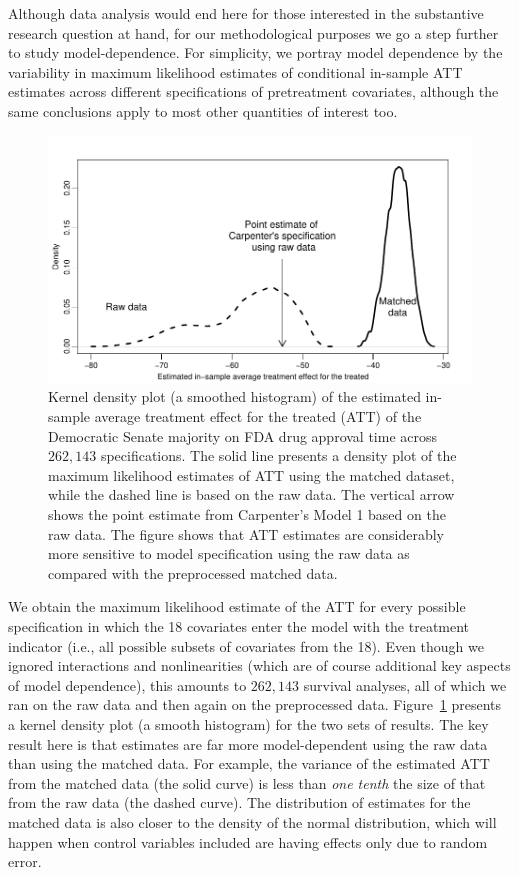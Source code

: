 \documentclass[11pt,titlepage]{article}
\begin{document}
Although data analysis would end here for those interested in the
substantive research question at hand, for our methodological purposes
we go a step further to study model-dependence.  For simplicity, we
portray model dependence by the variability in maximum likelihood
estimates of conditional in-sample ATT estimates across different
specifications of pretreatment covariates, although the same
conclusions apply to most other quantities of interest too.
\begin{figure}[t] 
 \begin{center}
   \includegraphics{figs/fdadens.pdf}
  \end{center}
  \vspace{-0.15in}
  \caption{Kernel density plot (a smoothed histogram) of the estimated
    in-sample average treatment effect for the treated (ATT) of the
    Democratic Senate majority on FDA drug approval time across
    $262,143$ specifications. The solid line presents a density plot
    of the maximum likelihood estimates of ATT using the matched
    dataset, while the dashed line is based on the raw data.  The
    vertical arrow shows the point estimate from Carpenter's Model 1
    based on the raw data.  The figure shows that ATT estimates are
    considerably more sensitive to model specification using the raw
    data as compared with the preprocessed matched data.}
  \label{fg:fdadens}
\end{figure}

We obtain the maximum likelihood estimate of the ATT for every
possible specification in which the 18 covariates enter the model with
the treatment indicator (i.e., all possible subsets of covariates from
the 18).  Even though we ignored interactions and nonlinearities
(which are of course additional key aspects of model dependence), this
amounts to $262,143$ survival analyses, all of which we ran on the raw
data and then again on the preprocessed data.  Figure~\ref{fg:fdadens}
presents a kernel density plot (a smooth histogram) for the two sets
of results.  The key result here is that estimates are far more
model-dependent using the raw data than using the matched data.  For
example, the variance of the estimated ATT from the matched data (the
solid curve) is less than \emph{one tenth} the size of that from the
raw data (the dashed curve).  The distribution of estimates for the
matched data is also closer to the density of the normal distribution, which will happen
when control variables included are having effects only due to random
error.
\end{document}
